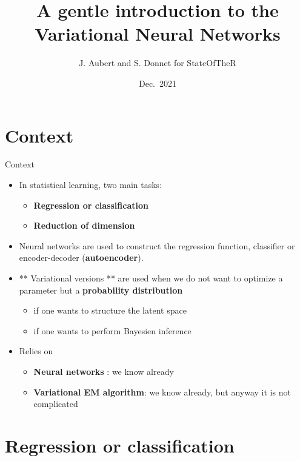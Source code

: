 \documentclass[
  12pt,
  ignorenonframetext,
  compress]{beamer}
\title{A gentle introduction to the Variational Neural Networks}
\author{J. Aubert and S. Donnet for StateOfTheR}
\date{Dec.~2021}
\providecommand{\tightlist}{%
  \setlength{\itemsep}{0pt}\setlength{\parskip}{0pt}}
\begin{document}
\frame{\titlepage}

\hypertarget{context}{%
\section{Context}\label{context}}

\begin{frame}{Context}
\begin{itemize}
\item
  In statistical learning, two main tasks:

  \begin{itemize}
  \tightlist
  \item
    \textbf{Regression or classification}
  \item
    \textbf{Reduction of dimension}
  \end{itemize}
\item
  Neural networks are used to construct the regression function,
  classifier or encoder-decoder (\textbf{autoencoder}).
\item
  ** Variational versions ** are used when we do not want to optimize a
  parameter but a \textbf{probability distribution}

  \begin{itemize}
  \tightlist
  \item
    if one wants to structure the latent space
  \item
    if one wants to perform Bayesien inference
  \end{itemize}
\item
  Relies on

  \begin{itemize}
  \tightlist
  \item
    \textbf{Neural networks} : we know already
  \item
    \textbf{Variational EM algorithm}: we know already, but anyway it is
    not complicated
  \end{itemize}
\end{itemize}
\end{frame}

\begin{frame}
\end{frame}

\hypertarget{regression-or-classification}{%
\section{Regression or
classification}\label{regression-or-classification}}
\end{document}

